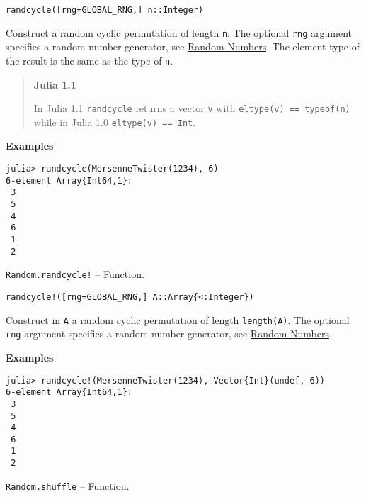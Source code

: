 \begin{adjustwidth}{2em}{0pt}


\begin{verbatim}
randcycle([rng=GLOBAL_RNG,] n::Integer)
\end{verbatim}

Construct a random cyclic permutation of length \texttt{n}. The optional \texttt{rng} argument specifies a random number generator, see \hyperlink{16621464973028186601}{Random Numbers}. The element type of the result is the same as the type of \texttt{n}.

\begin{quote}
\textbf{Julia 1.1}

In Julia 1.1 \texttt{randcycle} returns a vector \texttt{v} with \texttt{eltype(v) == typeof(n)} while in Julia 1.0 \texttt{eltype(v) == Int}.

\end{quote}
\textbf{Examples}


\begin{verbatim}
julia> randcycle(MersenneTwister(1234), 6)
6-element Array{Int64,1}:
 3
 5
 4
 6
 1
 2
\end{verbatim}



\end{adjustwidth}
\hypertarget{6946208329788361422}{} 
\hyperlink{6946208329788361422}{\texttt{Random.randcycle!}}  -- {Function.}

\begin{adjustwidth}{2em}{0pt}


\begin{verbatim}
randcycle!([rng=GLOBAL_RNG,] A::Array{<:Integer})
\end{verbatim}

Construct in \texttt{A} a random cyclic permutation of length \texttt{length(A)}. The optional \texttt{rng} argument specifies a random number generator, see \hyperlink{16621464973028186601}{Random Numbers}.

\textbf{Examples}


\begin{verbatim}
julia> randcycle!(MersenneTwister(1234), Vector{Int}(undef, 6))
6-element Array{Int64,1}:
 3
 5
 4
 6
 1
 2
\end{verbatim}



\end{adjustwidth}
\hypertarget{16742615893822221762}{} 
\hyperlink{16742615893822221762}{\texttt{Random.shuffle}}  -- {Function.}

